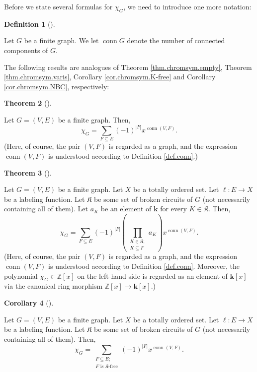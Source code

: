 \documentclass[numbers=enddot,12pt,final,onecolumn,notitlepage]{scrartcl}%
\theoremstyle{definition}
\newtheorem{theo}{Theorem}[section]
\newenvironment{theorem}[1][]
{\begin{theo}[#1]\begin{leftbar}}
{\end{leftbar}\end{theo}}
\newtheorem{defi}[theo]{Definition}
\newenvironment{definition}[1][]
{\begin{defi}[#1]\begin{leftbar}}
{\end{leftbar}\end{defi}}
\newtheorem{coro}[theo]{Corollary}
\newenvironment{corollary}[1][]
{\begin{coro}[#1]\begin{leftbar}}
{\end{leftbar}\end{coro}}
\let\sumnonlimits\sum
\let\prodnonlimits\prod
\renewcommand{\sum}{\sumnonlimits\limits}
\renewcommand{\prod}{\prodnonlimits\limits}
\begin{document}
Before we state several formulas for $\chi_{G}$, we need to introduce one more notation:

\begin{definition}
\label{def.conn}Let $G$ be a finite graph. We let $\operatorname*{conn}G$
denote the number of connected components of $G$.
\end{definition}

The following results are analogues of Theorem \ref{thm.chromsym.empty},
Theorem \ref{thm.chromsym.varis}, Corollary \ref{cor.chromsym.K-free} and
Corollary \ref{cor.chromsym.NBC}, respectively:

\begin{theorem}
\label{thm.chrompol.empty}Let $G=\left(  V,E\right)  $ be a finite graph.
Then,%
\[
\chi_{G}=\sum_{F\subseteq E}\left(  -1\right)  ^{\left\vert F\right\vert
}x^{\operatorname*{conn}\left(  V,F\right)  }.
\]
(Here, of course, the pair $\left(  V,F\right)  $ is regarded as a graph, and
the expression $\operatorname*{conn}\left(  V,F\right)  $ is understood
according to Definition \ref{def.conn}.)
\end{theorem}

\begin{theorem}
\label{thm.chrompol.varis}Let $G=\left(  V,E\right)  $ be a finite graph. Let
$X$ be a totally ordered set. Let $\ell:E\rightarrow X$ be a labeling
function. Let $\mathfrak{K}$ be some set of broken circuits of $G$ (not
necessarily containing all of them). Let $a_{K}$ be an element of $\mathbf{k}$
for every $K\in\mathfrak{K}$. Then,%
\[
\chi_{G}=\sum_{F\subseteq E}\left(  -1\right)  ^{\left\vert F\right\vert
}\left(  \prod_{\substack{K\in\mathfrak{K};\\K\subseteq F}}a_{K}\right)
x^{\operatorname*{conn}\left(  V,F\right)  }.
\]
(Here, of course, the pair $\left(  V,F\right)  $ is regarded as a graph, and
the expression $\operatorname*{conn}\left(  V,F\right)  $ is understood
according to Definition \ref{def.conn}. Moreover, the polynomial $\chi_{G}%
\in\mathbb{Z}\left[  x\right]  $ on the left-hand side is regarded as an
element of $\mathbf{k}\left[  x\right]  $ via the canonical ring morphism
$\mathbb{Z}\left[  x\right]  \rightarrow\mathbf{k}\left[  x\right]  $.)
\end{theorem}

\begin{corollary}
\label{cor.chrompol.K-free}Let $G=\left(  V,E\right)  $ be a finite graph. Let
$X$ be a totally ordered set. Let $\ell:E\rightarrow X$ be a labeling
function. Let $\mathfrak{K}$ be some set of broken circuits of $G$ (not
necessarily containing all of them). Then,%
\[
\chi_{G}=\sum_{\substack{F\subseteq E;\\F\text{ is }\mathfrak{K}\text{-free}%
}}\left(  -1\right)  ^{\left\vert F\right\vert }x^{\operatorname*{conn}\left(
V,F\right)  }.
\]

\end{corollary}
\end{document}
